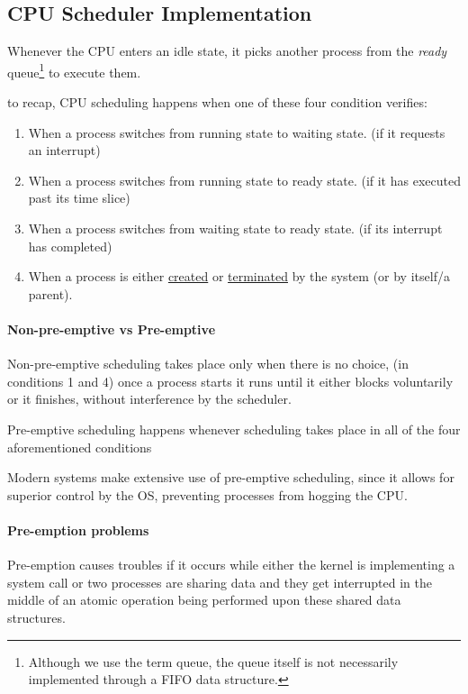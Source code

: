 \documentclass[openright, twoside]{report}
\theoremstyle{definition}
\theoremstyle{example}
\begin{document}
		\subsection{CPU Scheduler Implementation}
			Whenever the CPU enters an idle state, it picks another process from the \emph{ready} queue\footnote{
				Although we use the term queue, the queue itself is not necessarily implemented through a FIFO data structure.
			} to execute them.

			to recap, CPU scheduling happens when one of these four condition verifies:
			\begin{enumerate}
				\item When a process switches from running state to waiting state. (if it requests an interrupt)
				\item When a process switches from running state to ready state. (if it has executed past its time slice)
				\item When a process switches from waiting state to ready state. (if its interrupt has completed)
				\item When a process is either \hyperref[par:p_creation]{created} or 
				\hyperref[sec:p_termination]{terminated} by the system (or by itself/a parent).
			\end{enumerate}
			
			\paragraph{Non-pre-emptive vs Pre-emptive}
				\label{par:preem}
				Non-pre-emptive scheduling takes place only when 
				there is no choice, (in conditions 1 and 4)
				once a process starts it runs until it either blocks voluntarily or it finishes, without interference
				by the scheduler.

				Pre-emptive scheduling happens whenever scheduling takes place in all of the four aforementioned conditions 

				Modern systems make extensive use of pre-emptive scheduling, since it allows for superior 
				control by the OS, preventing processes from hogging the CPU.


			\paragraph{Pre-emption problems}
				Pre-emption causes troubles if it occurs while either the kernel is implementing a system call or 
				two processes are sharing data and they get interrupted in the middle of an atomic operation being
				performed upon these shared data structures.
\end{document}
